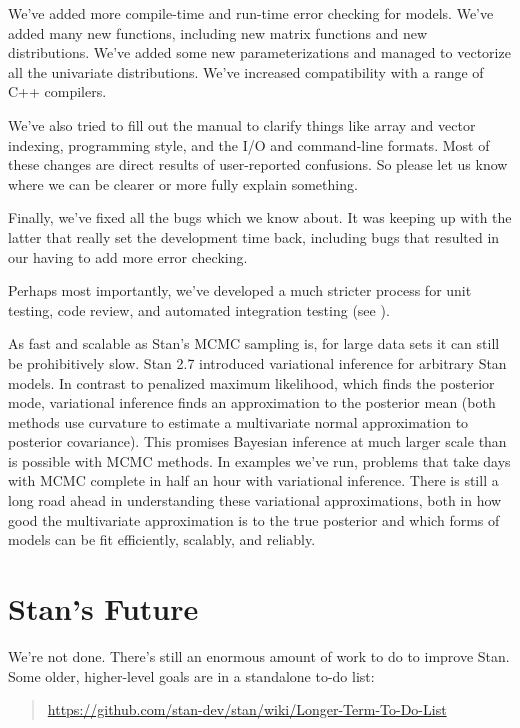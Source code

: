We've added more compile-time and run-time error checking for models.
We've added many new functions, including new matrix functions and new
distributions.  We've added some new parameterizations and managed to
vectorize all the univariate distributions.  We've increased
compatibility with a range of C++ compilers.

We've also tried to fill out the manual to clarify things like array
and vector indexing, programming style, and the I/O and command-line
formats.  Most of these changes are direct results of user-reported
confusions.  So please let us know where we can be clearer or more
fully explain something.

Finally, we've fixed all the bugs which we know about.  It was keeping
up with the latter that really set the development time back,
including bugs that resulted in our having to add more error checking.

Perhaps most importantly, we've developed a much stricter process for
unit testing, code review, and automated integration testing (see
).

As fast and scalable as Stan's MCMC sampling is, for large data sets
it can still be prohibitively slow.  Stan 2.7 introduced variational
inference for arbitrary Stan models.  In contrast to penalized maximum
likelihood, which finds the posterior mode, variational inference
finds an approximation to the posterior mean (both methods use
curvature to estimate a multivariate normal approximation to posterior
covariance).  This promises Bayesian inference at much larger scale than is
possible with MCMC methods.  In examples we've run, problems that take
days with MCMC complete in half an hour with variational inference.
There is still a long road ahead in understanding these variational
approximations, both in how good the multivariate approximation is to
the true posterior and which forms of models can be fit efficiently,
scalably, and reliably.


\section*{Stan's Future}

We're not done. There's still an enormous amount of work to do to
improve Stan.  Some older, higher-level goals are in a standalone
to-do list:
%
\begin{quote}
\url{https://github.com/stan-dev/stan/wiki/Longer-Term-To-Do-List}
\end{quote}

